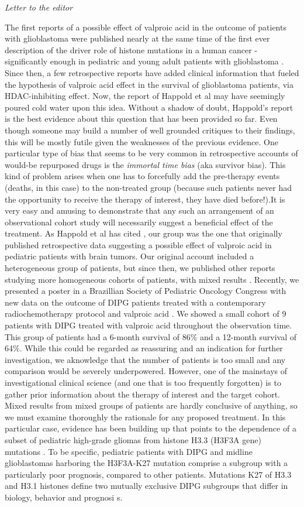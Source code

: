 \textit{Letter to the editor} 

The first reports \cite{Happold_2016} of a possible effect of valproic acid in the outcome of patients with glioblastoma were published nearly at the same time of the first ever description of the driver role of histone mutations in a human cancer - significantly enough in pediatric and young adult patients with glioblastoma \cite{Schwartzentruber_2012}. Since then, a few retrospective reports have added clinical information that fueled the hypothesis of valproic acid effect in the survival of glioblastoma patients, via HDAC-inhibiting effect. Now, the report of Happold et al \cite{Happold_2016} may have seemingly poured cold water upon this idea. Without a shadow of doubt, Happold's report is the best evidence about this question that has been provided so far. Even though someone may build a number of well grounded critiques to their findings, this will be mostly futile given the weaknesses of the previous evidence. One particular type of bias that seems to be very common in retrospective accounts of would-be repurposed drugs is the \textit{immortal time bias} \cite{Ho_2012} (aka survivor bias). This kind of problem arises when one has to forcefully add the pre-therapy events (deaths, in this case) to the non-treated group (because such patients never had the opportunity to receive the therapy of interest, they have died before!).It is very easy and amusing to demonstrate that any such an arrangement of an observational cohort study will necessarily suggest a beneficial effect of the treatment. As Happold et al has cited \cite{Happold_2016}, our group was the one that originally published retrospective data suggesting a possible effect of valproic acid in pediatric patients with brain tumors. Our original account included a heterogeneous group of patients, but since then, we published other reports studying more homogeneous cohorts of patients, with mixed results \cite{Felix_2012}. Recently, we presented a poster in a Brazillian Society of Pediatric Oncology Congress with new data on the outcome of DIPG patients treated with a contemporary radiochemotherapy protocol and valproic acid \cite{59c42273-d778-4fe5-8019-07a0e4509517}. We showed a small cohort of 9 patients with DIPG treated with valproic acid throughout the observation time. This group of patients had a 6-month survival of 86\% and a 12-month survival of 64\%. While this could be regarded as reassuring and an indication for further investigation, we aknowledge that the number of patients is too small and any comparison would be severely underpowered. However, one of the mainstays of investigational clinical science (and one that is too frequently forgotten) is to gather prior information about the therapy of interest and the target cohort. Mixed results from mixed groups of patients are hardly conclusive of anything, so we must examine thoroughly the rationale for any proposed treatment. In this particular case, evidence has been building up that points to the dependence of a subset of pediatric high-grade gliomas from histone H3.3 (H3F3A gene) mutations \cite{Wu_2012,Bender_2013,Venneti_2014,Solomon_2015}. To be specific, pediatric patients with DIPG and midline glioblastomas harboring the H3F3A-K27 mutation comprise a subgroup with a particularly poor prognosis, compared to other patients. Mutations K27 of H3.3 and H3.1 histones define two mutually exclusive DIPG subgroups that differ in biology, behavior and prognosi s\cite{Sturm_2012}.